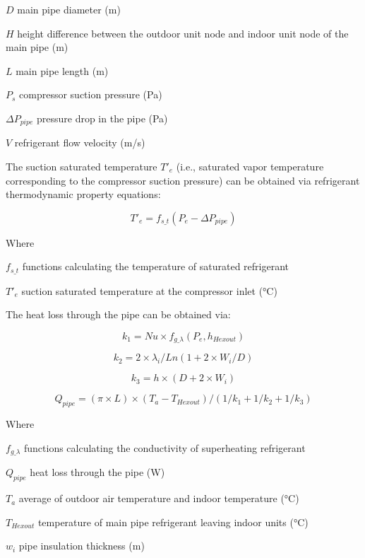 $D$ main pipe diameter (m) 

$H$ height difference between the outdoor unit node and indoor unit node of the main pipe (m)

$L$ main pipe length (m) 

$P_s$ compressor suction pressure (Pa) 

$\Delta{P_{pipe}}$ pressure drop in the pipe (Pa)

$V$ refrigerant flow velocity (m/s)

The suction saturated temperature $T'_e$ (i.e., saturated vapor temperature corresponding to the compressor suction pressure) can be obtained via refrigerant thermodynamic property equations:

\begin{equation}
  T'_e=f_{s\_t}(P_e-\Delta{P_{pipe}})
\end{equation}

Where

$f_{s\_t}$	functions calculating the temperature of saturated refrigerant

$T'_e$   	suction saturated temperature at the compressor inlet (°C)

The heat loss through the pipe can be obtained via:

\begin{equation}
k_1=Nu\times{f_{g\_\lambda}(P_e,h_{Hexout})}
\end{equation}

\begin{equation}k_2=2\times{\lambda_i}/Ln(1+2\times{W_i}/D)\end{equation}

\begin{equation}k_3=h\times(D+2\times{W_i})\end{equation}

\begin{equation}Q_{pipe}=(\pi\times{L})\times(T_a-T_{Hexout})/(1/k_1+1/k_2+1/k_3)\end{equation}

Where

$f_{g\_\lambda}$	functions calculating the conductivity of superheating refrigerant 

$Q_{pipe}$ 	heat loss through the pipe (W)

$T_a$ 	average of outdoor air temperature and indoor temperature (°C)

$T_{Hexout}$	temperature of main pipe refrigerant leaving indoor units (°C) 

$w_i$	pipe insulation thickness (m) 

